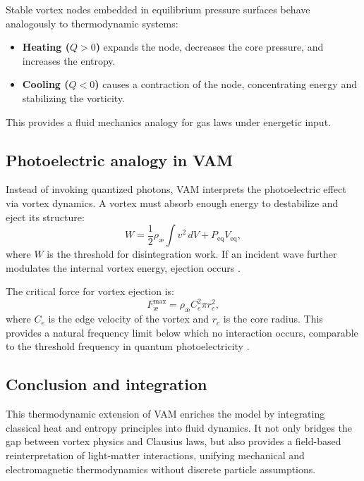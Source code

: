 Stable vortex nodes embedded in equilibrium pressure surfaces behave analogously to thermodynamic systems:
\begin{itemize}
    \item \textbf{Heating ($Q > 0$)} expands the node, decreases the core pressure, and increases the entropy. \item \textbf{Cooling ($Q < 0$)} causes a contraction of the node, concentrating energy and stabilizing the vorticity.
\end{itemize}
This provides a fluid mechanics analogy for gas laws under energetic input.

\subsection{Photoelectric analogy in VAM}

Instead of invoking quantized photons, VAM interprets the photoelectric effect via vortex dynamics. A vortex must absorb enough energy to destabilize and eject its structure:
\begin{equation}
    W = \frac{1}{2} \rho_\text{\ae} \int v^2 \, dV + P_\text{eq} V_\text{eq},\label{eq:photoelectric_work}
\end{equation}
where $W$ is the threshold for disintegration work. If an incident wave further modulates the internal vortex energy, ejection occurs \cite{vam2025unified}.

The critical force for vortex ejection is:
\begin{equation}
    F^{\text{max}}_{\text{\ae}} = \rho_\text{\ae} C_e^2 \pi r_c^2,\label{eq:critical_force}
\end{equation}
where $C_e$ is the edge velocity of the vortex and $r_c$ is the core radius. This provides a natural frequency limit below which no interaction occurs, comparable to the threshold frequency in quantum photoelectricity \cite{einstein1905photoelectric}.

\subsection*{Conclusion and integration}

This thermodynamic extension of VAM enriches the model by integrating classical heat and entropy principles into fluid dynamics. It not only bridges the gap between vortex physics and Clausius laws, but also provides a field-based reinterpretation of light-matter interactions, unifying mechanical and electromagnetic thermodynamics without discrete particle assumptions.